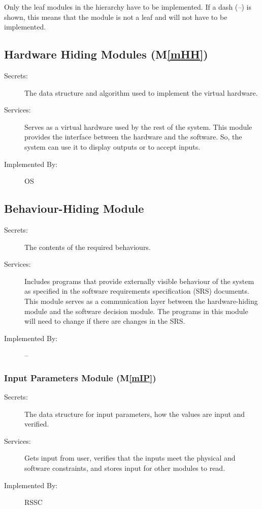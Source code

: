 \documentclass[12pt, titlepage]{article}
\newcommand{\mref}[1]{M\ref{#1}}
\begin{document}
Only the leaf modules in the hierarchy have to be implemented. If a dash
(\emph{--}) is shown, this means that the module is not a leaf and will not have
to be implemented.

\subsection{Hardware Hiding Modules (\mref{mHH})}

\begin{description}
\item[Secrets:]The data structure and algorithm used to implement the virtual
  hardware.
\item[Services:]Serves as a virtual hardware used by the rest of the
  system. This module provides the interface between the hardware and the
  software. So, the system can use it to display outputs or to accept inputs.
\item[Implemented By:] OS
\end{description}

\subsection{Behaviour-Hiding Module}

\begin{description}
\item[Secrets:]The contents of the required behaviours.
\item[Services:]Includes programs that provide externally visible behaviour of
  the system as specified in the software requirements specification (SRS)
  documents. This module serves as a communication layer between the
  hardware-hiding module and the software decision module. The programs in this
  module will need to change if there are changes in the SRS.
\item[Implemented By:] --
\end{description}

\subsubsection{Input Parameters Module (\mref{mIP})}

\begin{description}
\item[Secrets:]The data structure for input parameters, how the values are input and verified.
\item[Services:]Gets input from user, verifies that the inputs meet the physical and software constraints, and stores input for other modules to read.
\item[Implemented By:] RSSC
\end{description}
\end{document}
